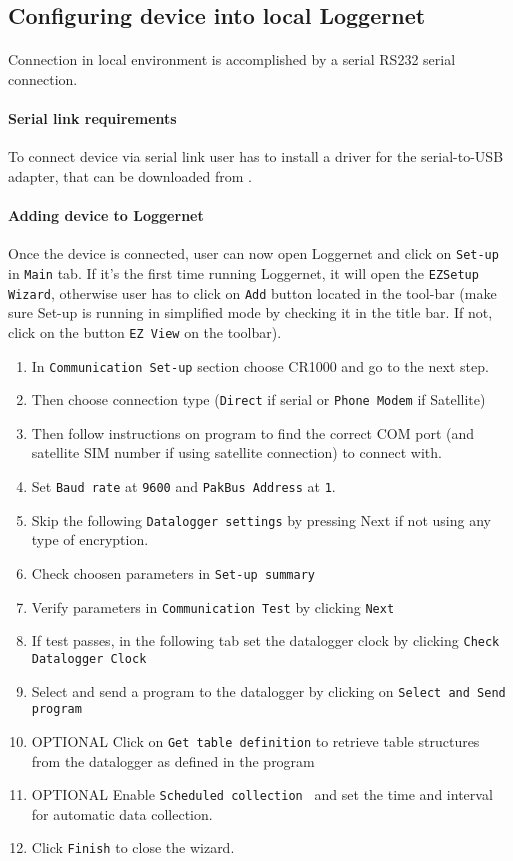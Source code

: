 \subsection{Configuring device into local Loggernet}
\paragraph{}
Connection in local environment is accomplished by a serial RS232 serial connection.
\paragraph{Serial link requirements}
To connect device via serial link user has to install a driver for the serial-to-USB adapter, that can be downloaded from \cite{prol1}.
\paragraph{Adding device to Loggernet}
Once the device is connected, user can now open Loggernet and click on {\tt Set-up} in {\tt Main} tab. If it's the first time running Loggernet, it will open the {\tt EZSetup Wizard}, 
otherwise user has to click on {\tt Add} button located in the tool-bar (make sure Set-up is running in simplified mode by checking it in the title bar. If not, click on the button {\tt EZ View} on the toolbar).
\begin{enumerate}
	\item In {\tt Communication Set-up} section choose CR1000 and go to the next step.
	\item Then choose connection type ({\tt Direct} if serial or {\tt Phone Modem} if Satellite)
	\item Then follow instructions on program to find the correct COM port (and satellite SIM number if using satellite connection) to connect with.
	\item Set {\tt Baud rate} at {\tt 9600} and {\tt PakBus Address} at {\tt 1}.
	\item Skip the following {\tt Datalogger settings} by pressing Next if not using any type of encryption.
	\item Check choosen parameters in {\tt Set-up summary}
	\item Verify parameters in {\tt Communication Test} by clicking {\tt Next}
	\item If test passes, in the following tab set the datalogger clock by clicking {\tt Check Datalogger Clock}
	\item Select and send a program to the datalogger by clicking on {\tt Select and Send program}
	\item OPTIONAL Click on {\tt Get table definition} to retrieve table structures from the datalogger as defined in the program
	\item OPTIONAL Enable {\tt Scheduled collection }  and set the time  and interval for automatic data collection.
	\item Click {\tt Finish} to close the wizard.
\end{enumerate}
